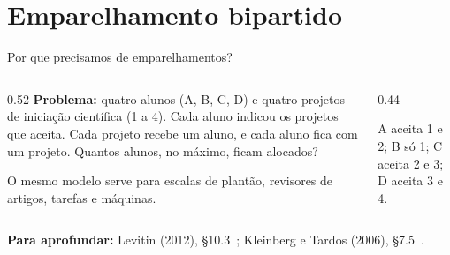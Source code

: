 \documentclass[aspectratio=169,xcolor=table]{beamer}
\newcommand{\arestasbip}{A/p1, A/p2, B/p1, C/p2, C/p3, D/p3, D/p4}
\newcommand{\nosbip}{%
  \node[vert] (A) at (0,1.2)  {A};  \node[vert] (B) at (0,0.4)  {B};
  \node[vert] (C) at (0,-0.4) {C};  \node[vert] (D) at (0,-1.2) {D};
  \node[vert] (p1) at (2,1.2)  {1}; \node[vert] (p2) at (2,0.4)  {2};
  \node[vert] (p3) at (2,-0.4) {3}; \node[vert] (p4) at (2,-1.2) {4};
}
\newcommand{\bip}[2]{%
  \nosbip
  \foreach \u/\v in \arestasbip \draw[aresta] (\u) -- (\v);
  \def\lista{#1}\ifx\lista\empty\else
    \foreach \u/\v in {#1} \draw[emp] (\u) -- (\v);\fi
  \def\lista{#2}\ifx\lista\empty\else
    \foreach \u/\v in {#2} \draw[alt] (\u) -- (\v);\fi
}
\newcommand{\fonte}[1]{%
  \vfill
  {\tiny\color{gray!55!black}\textbf{Para aprofundar:} #1\par}%
}
\begin{document}
\section{Emparelhamento bipartido}

\begin{frame}{Por que precisamos de emparelhamentos?}
  \begin{columns}[c]
    \begin{column}{0.52\textwidth}
      \textbf{Problema:} quatro alunos (A, B, C, D) e quatro projetos de iniciação científica
      (1 a 4). Cada aluno indicou os projetos que aceita. Cada projeto recebe um aluno, e cada
      aluno fica com um projeto. Quantos alunos, no máximo, ficam alocados?
      \medskip

      {\scriptsize O mesmo modelo serve para escalas de plantão, revisores de artigos, tarefas
      e máquinas.\par}
    \end{column}
    \begin{column}{0.44\textwidth}
      \begin{center}
      \end{center}
      {\scriptsize A aceita 1 e 2; B só 1; C aceita 2 e 3; D aceita 3 e 4.\par}
    \end{column}
  \end{columns}
  \fonte{Levitin (2012), \S 10.3~\cite{levitin2012introduction};
    Kleinberg e Tardos (2006), \S 7.5~\cite{kleinberg2006algorithm}.}
\end{frame}
\end{document}
